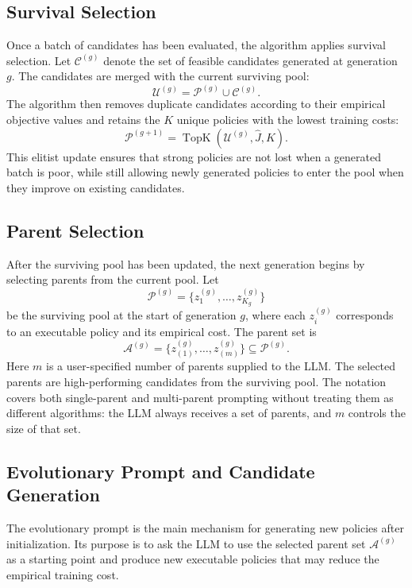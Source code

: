 \documentclass[11pt]{article}
\begin{document}
\subsection{Survival Selection}
\label{sec:survival_selection}

Once a batch of candidates has been evaluated, the algorithm applies survival selection. Let $\mathcal C^{(g)}$ denote the set of feasible candidates generated at generation $g$. The candidates are merged with the current surviving pool:
\[
\mathcal U^{(g)}=\mathcal P^{(g)}\cup \mathcal C^{(g)}.
\]
The algorithm then removes duplicate candidates according to their empirical objective values and retains the $K$ unique policies with the lowest training costs:
\[
\mathcal P^{(g+1)}
=
\operatorname{TopK}\left(\mathcal U^{(g)},\hat J,K\right).
\]
This elitist update ensures that strong policies are not lost when a generated batch is poor, while still allowing newly generated policies to enter the pool when they improve on existing candidates.

\subsection{Parent Selection}
\label{sec:parent_selection}

After the surviving pool has been updated, the next generation begins by selecting parents from the current pool. Let
\[
\mathcal P^{(g)}=\{z_1^{(g)},\ldots,z_{K_g}^{(g)}\}
\]
be the surviving pool at the start of generation $g$, where each $z_i^{(g)}$ corresponds to an executable policy and its empirical cost. The parent set is
\[
\mathcal A^{(g)}=\{z_{(1)}^{(g)},\ldots,z_{(m)}^{(g)}\}\subseteq \mathcal P^{(g)}.
\]
Here $m$ is a user-specified number of parents supplied to the LLM. The selected parents are high-performing candidates from the surviving pool. The notation covers both single-parent and multi-parent prompting without treating them as different algorithms: the LLM always receives a set of parents, and $m$ controls the size of that set.

\subsection{Evolutionary Prompt and Candidate Generation}
\label{sec:prompt_generation}

The evolutionary prompt is the main mechanism for generating new policies after initialization. Its purpose is to ask the LLM to use the selected parent set $\mathcal A^{(g)}$ as a starting point and produce new executable policies that may reduce the empirical training cost.
\end{document}
